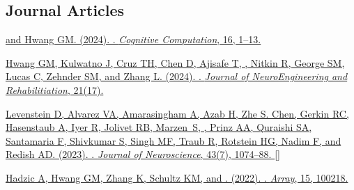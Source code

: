 


\subsection*{Journal Articles}
\label{sec:journalpubs}
\vspace{-0.1in}

\begin{description}[itemsep=8pt]
  \item \href{https://dx.doi.org/10.1007/s12559-022-10081-9}
    { and Hwang GM. (2024). . \emph{Cognitive
    Computation}, 16, 1--13. }
  \item \href{https://doi.org/10.1186/s12984-024-01308-x}
    {Hwang GM, Kulwatno J, Cruz TH, Chen D, Ajisafe T, , Nitkin R, George SM, Lucas C, Zehnder SM, and Zhang L.
      (2024). .
    \emph{Journal of NeuroEngineering and Rehabilitiation}, 21(17). 
    }
  \item \href{https://doi.org/10.1523/JNEUROSCI.1179-22.2022}
    {Levenstein D, Alvarez VA, Amarasingham A, Azab H, Zhe S. Chen, Gerkin
      RC, Hasenstaub A, Iyer R, Jolivet RB, Marzen~S, , Prinz
      AA, Quraishi SA, Santamaria F, Shivkumar S, Singh MF, Traub R, Rotstein
      HG, Nadim F, and Redish AD. (2023). . \emph{Journal of Neuroscience}, 43(7), 1074--88.
    } []
  \item \href{https://doi.org/10.1016/j.array.2022.100218}{Hadzic
      A, Hwang GM, Zhang K, Schultz KM, and . (2022).
      . \emph{Array}, 15, 100218.
    }

\end{description}
